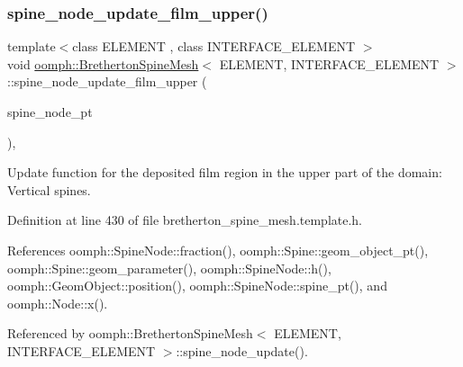 \subsubsection{\texorpdfstring{spine\+\_\+node\+\_\+update\+\_\+film\+\_\+upper()}{spine\_node\_update\_film\_upper()}}
{\footnotesize\ttfamily template$<$class E\+L\+E\+M\+E\+NT , class I\+N\+T\+E\+R\+F\+A\+C\+E\+\_\+\+E\+L\+E\+M\+E\+NT $>$ \\
void \hyperlink{classoomph_1_1BrethertonSpineMesh}{oomph\+::\+Bretherton\+Spine\+Mesh}$<$ E\+L\+E\+M\+E\+NT, I\+N\+T\+E\+R\+F\+A\+C\+E\+\_\+\+E\+L\+E\+M\+E\+NT $>$\+::spine\+\_\+node\+\_\+update\+\_\+film\+\_\+upper (\begin{DoxyParamCaption}\item[{\hyperlink{classoomph_1_1SpineNode}{Spine\+Node} $\ast$}]{spine\+\_\+node\+\_\+pt }\end{DoxyParamCaption})\hspace{0.3cm}{\ttfamily [inline]}, {\ttfamily [protected]}}



Update function for the deposited film region in the upper part of the domain\+: Vertical spines. 



Definition at line 430 of file bretherton\+\_\+spine\+\_\+mesh.\+template.\+h.



References oomph\+::\+Spine\+Node\+::fraction(), oomph\+::\+Spine\+::geom\+\_\+object\+\_\+pt(), oomph\+::\+Spine\+::geom\+\_\+parameter(), oomph\+::\+Spine\+Node\+::h(), oomph\+::\+Geom\+Object\+::position(), oomph\+::\+Spine\+Node\+::spine\+\_\+pt(), and oomph\+::\+Node\+::x().



Referenced by oomph\+::\+Bretherton\+Spine\+Mesh$<$ E\+L\+E\+M\+E\+N\+T, I\+N\+T\+E\+R\+F\+A\+C\+E\+\_\+\+E\+L\+E\+M\+E\+N\+T $>$\+::spine\+\_\+node\+\_\+update().

\mbox{\label{classoomph_1_1BrethertonSpineMesh_a0dc35290fc96a075d864e79528e5fec8}} 
